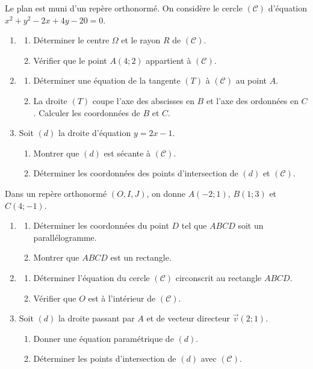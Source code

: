 Le plan est muni d'un repère orthonormé. On considère le cercle $(\mathcal{C})$ d'équation $x^2 + y^2 - 2x + 4y - 20 = 0$.
\begin{enumerate}[label=\arabic*)]
    \item 
    \begin{enumerate}[label=\alph*)]
        \item Déterminer le centre $\Omega$ et le rayon $R$ de $(\mathcal{C})$.
        \item Vérifier que le point $A(4; 2)$ appartient à $(\mathcal{C})$.
    \end{enumerate}
    \item 
    \begin{enumerate}[label=\alph*)]
        \item Déterminer une équation de la tangente $(T)$ à $(\mathcal{C})$ au point $A$.
        \item La droite $(T)$ coupe l'axe des abscisses en $B$ et l'axe des ordonnées en $C$. Calculer les coordonnées de $B$ et $C$.
    \end{enumerate}
    \item Soit $(d)$ la droite d'équation $y = 2x - 1$.
    \begin{enumerate}[label=\alph*)]
        \item Montrer que $(d)$ est sécante à $(\mathcal{C})$.
        \item Déterminer les coordonnées des points d'intersection de $(d)$ et $(\mathcal{C})$.
    \end{enumerate}
\end{enumerate}

Dans un repère orthonormé $(O, I, J)$, on donne $A(-2; 1)$, $B(1; 3)$ et $C(4; -1)$.
\begin{enumerate}[label=\arabic*)]
    \item 
    \begin{enumerate}[label=\alph*)]
        \item Déterminer les coordonnées du point $D$ tel que $ABCD$ soit un parallélogramme.
        \item Montrer que $ABCD$ est un rectangle.
    \end{enumerate}
    \item 
    \begin{enumerate}[label=\alph*)]
        \item Déterminer l'équation du cercle $(\mathcal{C})$ circonscrit au rectangle $ABCD$.
        \item Vérifier que $O$ est à l'intérieur de $(\mathcal{C})$.
    \end{enumerate}
    \item Soit $(d)$ la droite passant par $A$ et de vecteur directeur $\vec{v}(2; 1)$.
    \begin{enumerate}[label=\alph*)]
        \item Donner une équation paramétrique de $(d)$.
        \item Déterminer les points d'intersection de $(d)$ avec $(\mathcal{C})$.
    \end{enumerate}
\end{enumerate}

